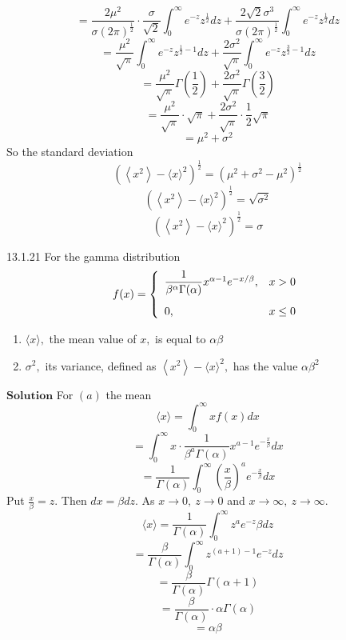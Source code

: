 \documentclass{article}
\begin{document}
\begin{flushleft}
$$=\frac{2 \mu^{2}}{\sigma(2 \pi)^{\frac{1}{2}}} \cdot \frac{\sigma}{\sqrt{2}} \int_{0}^{\infty} e^{-z} z^{\frac{1}{2}} d z+\frac{2 \sqrt{2} \sigma^{3}}{\sigma(2 \pi)^{\frac{1}{2}}} \int_{0}^{\infty} e^{-z} z^{\frac{1}{2}} d z$$
$$=\frac{\mu^{2}}{\sqrt{\pi}} \int_{0}^{\infty} e^{-z} z^{\frac{1}{2}-1} d z+\frac{2 \sigma^{2}}{\sqrt{\pi}} \int_{0}^{\infty} e^{-z} z^{\frac{3}{2}-1} d z$$
$$=\frac{\mu^{2}}{\sqrt{\pi}} \Gamma\left(\frac{1}{2}\right)+\frac{2 \sigma^{2}}{\sqrt{\pi}} \Gamma\left(\frac{3}{2}\right)$$
$$=\frac{\mu^{2}}{\sqrt{\pi}} \cdot \sqrt{\pi}+\frac{2 \sigma^{2}}{\sqrt{\pi}} \cdot \frac{1}{2} \sqrt{\pi}$$
$$=\mu^{2}+\sigma^{2}$$
So the standard deviation 
$$\left(\left\langle x^{2}\right\rangle-\langle x\rangle^{2}\right)^{\frac{1}{2}}=\left(\mu^{2}+\sigma^{2}-\mu^{2}\right)^{\frac{1}{2}}$$
$$\left(\left\langle x^{2}\right\rangle-\langle x\rangle^{2}\right)^{\frac{1}{2}}=\sqrt{\sigma^{2}}$$
$$\left(\left\langle x^{2}\right\rangle-\langle x\rangle^{2}\right)^{\frac{1}{2}}=\sigma$$


\newpage

\begin{mybox}{13.1.21}
For the gamma distribution
$$
f(x)=\left\{\begin{array}{ll}
\dfrac{1}{\beta^{\alpha} \Gamma(\alpha)} x^{\alpha-1} e^{-x / \beta}, & x>0 \vspace{3mm}\\
0, & x \leq 0
\end{array}\right.
$$
\begin{enumerate}[$(a)$]
\item $\langle x\rangle,$ the mean value of $x,$ is equal to $\alpha \beta$
\item $\sigma^{2},$ its variance, defined as $\left\langle x^{2}\right\rangle-\langle x\rangle^{2},$ has the value $\alpha \beta^{2}$
\end{enumerate}
\end{mybox}

$\boxed{\textbf{Solution}}$ For $(a)$ the mean
$$
\langle x\rangle=\int_{0}^{\infty} x f(x) d x
$$
$$=\int_{0}^{\infty} x \cdot \frac{1}{\beta^{a} \Gamma(\alpha)} x^{a-1} e^{-\frac{x}{\beta}} d x$$
$$=\frac{1}{\Gamma(\alpha)} \int_{0}^{\infty}\left(\frac{x}{\beta}\right)^{a} e^{-\frac{x}{\beta}} d x$$
Put $\frac{x}{\beta}=z .$ Then $d x=\beta d z .$ As $x \rightarrow 0, \  z \rightarrow 0$ and $x \rightarrow \infty, \  z \rightarrow \infty$.
$$
\langle x\rangle=\frac{1}{\Gamma(\alpha)} \int_{0}^{\infty} z^{a} e^{-z} \beta d z
$$
$$=\frac{\beta}{\Gamma(\alpha)} \int_{0}^{\infty} z^{(a+1)-1} e^{-z} d z$$
$$=\frac{\beta}{\Gamma(\alpha)} \Gamma(\alpha+1)$$
$$=\frac{\beta}{\Gamma(\alpha)} \cdot \alpha \Gamma(\alpha)$$
$$=\alpha \beta$$


\end{flushleft}
\end{document}

